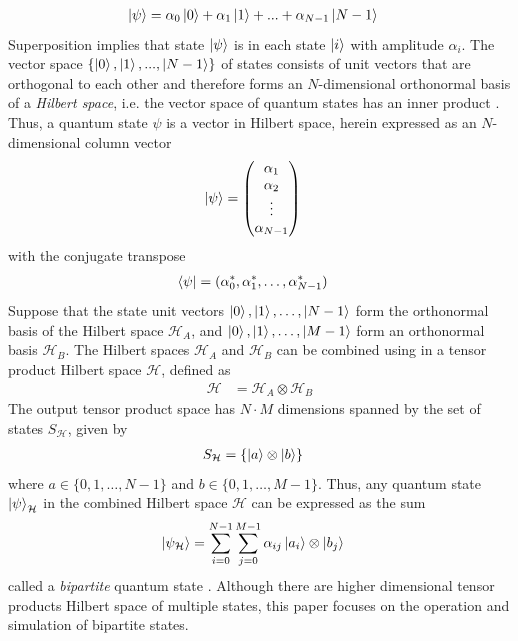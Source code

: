 \begin{align}
	\ket{\psi}	& = \alpha_0 \ket{0} + \alpha_1\ket{1} + ... + \alpha_{N-1} \ket{N-1}
\end{align}
Superposition implies that state $\ket{\psi}$ is in each state $\ket{i}$ with amplitude $\alpha_i$. The vector space $\{\ket{0}, \ket{1}, ..., \ket{N-1}\}$ of states consists of unit vectors that are orthogonal to each other and therefore forms an $N$-dimensional orthonormal basis of a \textit{Hilbert space}, i.e. the vector space of quantum states has an inner product \cite{DeWolf2019}. Thus, a quantum state $\psi$ is a vector in Hilbert space, herein expressed as an $N$-dimensional column vector
\begin{align}
	\ket{\psi}	& = \left(\begin{matrix}
		\alpha_{1} \\
		\alpha_{2} \\
		\vdots \\
		\alpha_{N-1}
	\end{matrix}\right)
\end{align}
with the conjugate transpose
\begin{align}
	\bra{\psi}	& = (\alpha_{0}^{*}, \alpha_{1}^{*}, \hdots, \alpha_{N-1}^{*})
\end{align}
Suppose that the state unit vectors $\ket{0}, \ket{1}, \hdots, \ket{N-1}$ form the orthonormal basis of the Hilbert space $\mathcal{H}_A$, and $\ket{0}, \ket{1}, \hdots, \ket{M-1}$ form an orthonormal basis $\mathcal{H}_B$. The Hilbert spaces $\mathcal{H}_A$ and $\mathcal{H}_B$ can be combined using in a tensor product Hilbert space $\mathcal{H}$, defined as
\begin{align}
	\mathcal{H}	& = \mathcal{H}_A \otimes \mathcal{H}_B 
\end{align}
The output tensor product space has $N\cdot M$ dimensions spanned by the set of states $S_{\mathcal{H}}$, given by
\begin{align}
 S_{\mathcal{H}}	& = \{\ket{a} \otimes \ket{b}\}
\end{align}
where $a \in \{0,1,\hdots, N-1\}$ and $ b \in \{0,1,\hdots, M-1\}$. Thus, any quantum state $\ket{\psi}_{\mathcal{H}}$ in the combined Hilbert space $\mathcal{H}$ can be expressed as the sum
\begin{align}
	\ket{\psi_\mathcal{H}} & = \sum_{i=0}^{N-1}\sum_{j=0}^{M-1} \alpha_{ij} \ket{a_i} \otimes \ket{b_j}
\end{align}
called a \textit{bipartite} quantum state \cite{DeWolf2019}. Although there are higher dimensional tensor products Hilbert space of multiple states, this paper focuses on the operation and simulation of bipartite states.

